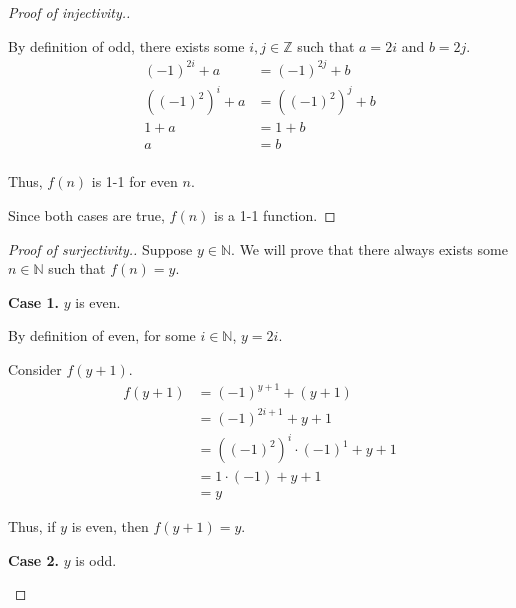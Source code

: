 \documentclass{article}
\begin{document}
\begin{outline}[enumerate]
\begin{proof}[Proof of injectivity.]
\begin{adjustwidth}{0.5cm}{0.5cm}
            By definition of odd, there exists some $i, j \in \mathbb{Z}$ such that $a = 2i$ and $b = 2j$. 
            \begin{equation}
                \begin{aligned}
                    (-1)^{2i} + a &= (-1)^{2j} + b \\
                    ((-1)^2)^i + a &= 
                    ((-1)^2)^j + b \\
                    1 + a &= 1 + b \\
                    a &= b \\
                \end{aligned}
            \end{equation}
        
            Thus, $f(n)$ is 1-1 for even $n$.
        \end{adjustwidth}

        Since both cases are true, $f(n)$ is a 1-1 function.
    \end{proof}
    \begin{proof}[Proof of surjectivity.]
        Suppose $y \in \mathbb{N}$. We will prove that there always exists some $n \in \mathbb{N}$ such that $f(n) = y$.

        \textbf{Case 1.} $y$ is even.
        \begin{adjustwidth}{0.5cm}{0.5cm}

            By definition of even, for some $i \in \mathbb{N}$, $y = 2i$.

            Consider $f(y + 1)$.
            \begin{equation}
                \begin{aligned}
                    f(y + 1) &= (-1)^{y + 1} + (y + 1) \\
                    &= (-1)^{2i + 1} + y + 1 \\
                    &= ((-1)^2)^i \cdot (-1)^{1} + y + 1 \\
                    &= 1\cdot(-1) + y + 1 \\
                    &= y
                \end{aligned}
            \end{equation}

            Thus, if $y$ is even, then $f(y + 1) = y$.
        \end{adjustwidth}

        \textbf{Case 2.} $y$ is odd.
        \begin{adjustwidth}{0.5cm}{0.5cm}


\end{adjustwidth}
\end{proof}
\end{outline}
\end{document}

